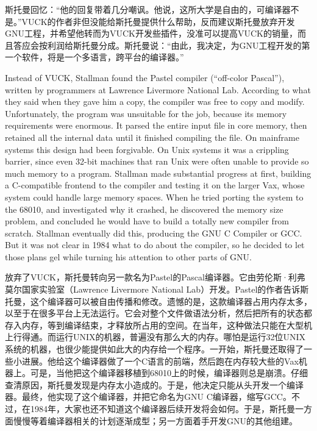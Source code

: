 \ifdefined\chs
斯托曼回忆：``他的回复带着几分嘲讽。他说，这所大学是自由的，可编译器不是。''VUCK的作者非但没能给斯托曼提供什么帮助，反而建议斯托曼放弃开发GNU工程，并希望他转而为VUCK开发些插件，没准可以提高VUCK的销量，而且答应会按利润给斯托曼分成。斯托曼说：``由此，我决定，为GNU工程开发的第一个软件，将是一个多语言，跨平台的编译器。''
\fi

\ifdefined\eng
Instead of VUCK, Stallman found the Pastel compiler (``off-color Pascal''), written by programmers at Lawrence Livermore National Lab. According to what they said when they gave him a copy, the compiler was free to copy and modify. Unfortunately, the program was unsuitable for the job, because its memory requirements were enormous.  It parsed the entire input file in core memory, then retained all the internal data until it finished compiling the file. On mainframe systems this design had been forgivable. On Unix systems it was a crippling barrier, since even 32-bit machines that ran Unix were often unable to provide so much memory to a program. Stallman made substantial progress at first, building a C-compatible frontend to the compiler and testing it on the larger Vax, whose system could handle large memory spaces. When he tried porting the system to the 68010, and investigated why it crashed,  he discovered the memory size problem, and concluded he would have to build a totally new compiler from scratch.  Stallman eventually did this, producing the GNU C Compiler or GCC.  But it was not clear in 1984 what to do about the compiler, so he decided to let those plans gel while turning his attention to other parts of GNU.
\fi

\ifdefined\chs
放弃了VUCK，斯托曼转向另一款名为Pastel的Pascal编译器。它由劳伦斯·利弗莫尔国家实验室（Lawrence Livermore National Lab）开发。Pastel的作者告诉斯托曼，这个编译器可以被自由传播和修改。遗憾的是，这款编译器占用内存太多，以至于在很多平台上无法运行。它会对整个文件做语法分析，然后把所有的状态都存入内存，等到编译结束，才释放所占用的空间。在当年，这种做法只能在大型机上行得通。而运行UNIX的机器，普遍没有那么大的内存。哪怕是运行32位UNIX系统的机器，也很少能提供如此大的内存给一个程序。一开始，斯托曼还取得了一些小进展。他给这个编译器做了一个C语言的前端，然后跑在内存较大些的Vax机器上。可是，当他把这个编译器移植到68010上的时候，编译器则总是崩溃。仔细查清原因，斯托曼发现是内存太小造成的。于是，他决定只能从头开发一个编译器。最终，他实现了这个编译器，并把它命名为GNU C编译器，缩写GCC。不过，在1984年，大家也还不知道这个编译器后续开发将会如何。于是，斯托曼一方面慢慢等着编译器相关的计划逐渐成型；另一方面着手开发GNU的其他组建。
\fi

